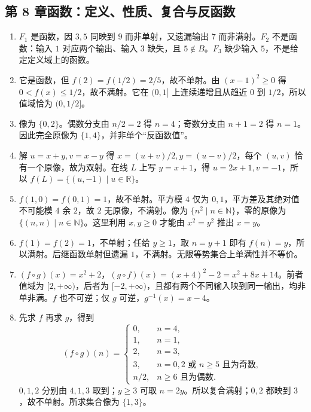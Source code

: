 \documentclass[UTF8,fontset=none,zihao=-4,a4paper]{ctexart}
\begin{document}
\subsection*{第 8 章\quad 函数：定义、性质、复合与反函数}
\begin{enumerate}[label=8.\arabic*.,leftmargin=2.8em]
\item $F_1$ 是函数，因 $3,5$ 同映到 $9$ 而非单射，又遗漏输出 $7$ 而非满射。$F_2$ 不是函数：输入 $1$ 对应两个输出、输入 $3$ 缺失，且 $5\notin B$。$F_3$ 缺少输入 $5$，不是给定定义域上的函数。

\item 它是函数，但 $f(2)=f(1/2)=2/5$，故不单射。由 $(x-1)^2\ge0$ 得 $0<f(x)\le1/2$，故不满射。它在 $(0,1]$ 上连续递增且从趋近 $0$ 到 $1/2$，所以值域恰为 $(0,1/2]$。

\item 像为 $\{0,2\}$。偶数分支由 $n/2=2$ 得 $n=4$；奇数分支由 $n+1=2$ 得 $n=1$。因此完全原像为 $\{1,4\}$，并非单个“反函数值”。

\item 解 $u=x+y,v=x-y$ 得 $x=(u+v)/2,y=(u-v)/2$，每个 $(u,v)$ 恰有一个原像，故为双射。在线 $L$ 上写 $y=x+1$，得 $u=2x+1,v=-1$，所以 $f(L)=\{(u,-1)\mid u\in\mathbb R\}$。

\item $f(1,0)=f(0,1)=1$，故不单射。平方模 $4$ 仅为 $0,1$，平方差及其绝对值不可能模 $4$ 余 $2$，故 $2$ 无原像，不满射。像为 $\{n^2\mid n\in\mathbb N\}$，零的原像为 $\{(n,n)\mid n\in\mathbb N\}$。这里利用 $x,y\ge0$ 才能由 $x^2=y^2$ 推出 $x=y$。

\item $f(1)=f(2)=1$，不单射；任给 $y\ge1$，取 $n=y+1$ 即有 $f(n)=y$，所以满射。后继函数单射但遗漏 $1$，不满射。无限等势集合上单满性并不等价。

\item $(f\circ g)(x)=x^2+2$，$(g\circ f)(x)=(x+4)^2-2=x^2+8x+14$。前者值域为 $[2,+\infty)$，后者为 $[-2,+\infty)$，且都有两个不同输入映到同一输出，均非单非满。$f$ 也不可逆；仅 $g$ 可逆，$g^{-1}(x)=x-4$。

\item 先求 $f$ 再求 $g$，得到
\[
(f\circ g)(n)=\begin{cases}
0,&n=4,\\1,&n=1,\\2,&n=3,\\3,&n=0,2\text{ 或 }n\ge5\text{ 且为奇数},\\n/2,&n\ge6\text{ 且为偶数}.
\end{cases}
\]
$0,1,2$ 分别由 $4,1,3$ 取到；$y\ge3$ 可取 $n=2y$。所以复合满射；$0,2$ 都映到 $3$，故不单射。所求集合像为 $\{1,3\}$。


\end{enumerate}
\end{document}
